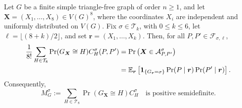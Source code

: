 \begin{samepage}
\begin{lemma}\label{lem:exact-flag-square}
Let $G$ be a finite simple triangle-free graph of order $n\geq1$,
and let $\boldsymbol{X}=(X_1,\ldots,X_8)\in V(G)^8$, where the coordinates $X_i$
are independent and uniformly distributed on $V(G)$.
Fix $\sigma\in\mathcal T_k$, with $0\leq k\leq6$, let
$\ell=\lfloor(8+k)/2\rfloor$, and set $\boldsymbol{r}=(X_1,\ldots,X_k)$.
Then, for all $P,P'\in\mathcal F_{\sigma,\ell}$,
\begin{align}
\frac1{8!}\sum_{H\in\mathcal T_8}
\Pr(G_{\boldsymbol{X}}\cong H)C_H^\sigma(P,P')
&=\Pr\big(\boldsymbol{X}\in\mathcal A^\sigma_{P,P'}\big)\notag\\
&=\mathbb E_{\boldsymbol{r}}\left[\mathbf 1_{\{G_{\boldsymbol{r}}=\sigma\}}
\Pr(P\mid \boldsymbol{r})\Pr(P'\mid \boldsymbol{r})\right].
\label{eq:flag-entry-average}
\end{align}
Consequently,
\begin{equation}\label{eq:averaged-count-psd}
M_G^\sigma:=\sum_{H\in\mathcal T_8}\Pr(G_{\boldsymbol{X}}\cong H)C_H^\sigma
\quad\text{is positive semidefinite}.
\end{equation}
\end{lemma}
\end{samepage}

